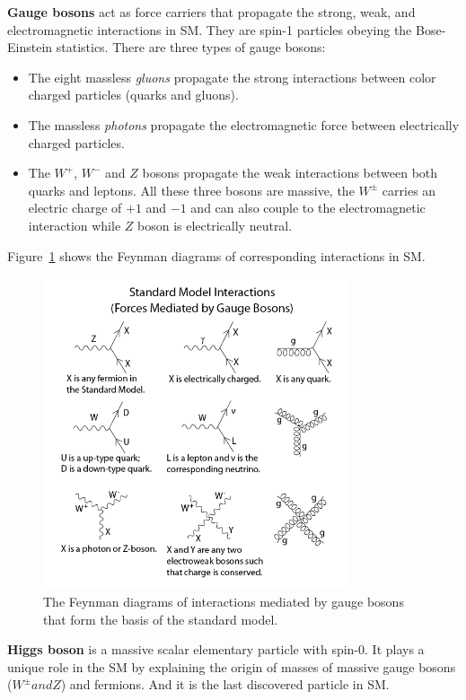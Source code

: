\textbf{Gauge bosons}
act as force carriers that propagate the strong, weak, and electromagnetic interactions in SM.
They are spin-1 particles obeying the Bose-Einstein statistics. 
There are three types of gauge bosons:
\begin{itemize}
  \item The eight massless \textit{gluons} propagate the strong interactions between color charged particles (quarks and gluons).
  \item The massless \textit{photons} propagate the electromagnetic force between electrically charged particles.
  \item The $W^{+}$, $W^{-}$ and $Z$ bosons propagate the weak interactions between both quarks and leptons. All these three bosons are massive, the $W^{\pm}$ carries an electric charge of $+1$ and $−1$ and can also couple to the electromagnetic interaction while $Z$ boson is electrically neutral.
\end{itemize}
Figure~\ref{fig:eleP-2} shows the Feynman diagrams of corresponding interactions in SM.
\begin{figure}[!htb]
  \centering
  \includegraphics[width=0.8\textwidth]{figures/Theory/Standard_Model_Feynman_Diagram_Vertices.png}
  \caption{The Feynman diagrams of interactions mediated by gauge bosons that form the basis of the standard model.}
  \label{fig:eleP-2}
\end{figure}

\textbf{Higgs boson}
is a massive scalar elementary particle with spin-0. 
It plays a unique role in the SM by explaining the origin of masses of massive gauge bosons ($W^{\pm} and Z$) and fermions. 
And it is the last discovered particle in SM.
